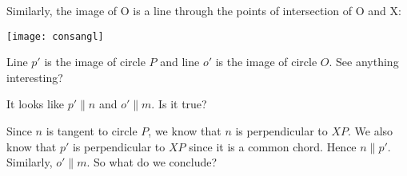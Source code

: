 Similarly, the image of O is a line through the points of intersection of O and X:

\begin{center}
    \texttt{[image: consangl]}    
\end{center}
Line $p'$ is the image of circle $P$ and line $o'$ is the image of circle $O$.  See anything interesting?








It looks like $p' \parallel n$ and $o' \parallel m$.  Is it true?







Since $n$ is tangent to circle $P$, we know that $n$ is perpendicular to $XP$.  We also know that $p'$ is perpendicular to $XP$ since it is a common chord.  Hence $n \parallel p'$.  Similarly, $o' \parallel m$.  So what do we conclude?

